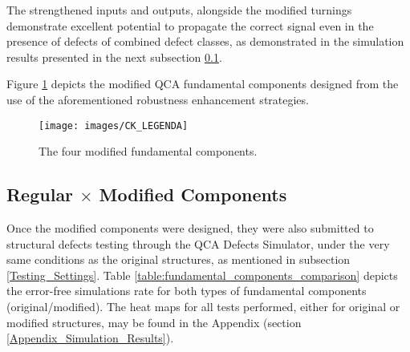 The strengthened inputs and outputs, alongside the modified turnings demonstrate excellent potential to propagate the correct signal even in the presence of defects of combined defect classes, as demonstrated in the simulation results presented in the next subsection \ref{subsection:Comparison_Between_Robustness_Levels}.

Figure \ref{figure:modified_fundamental_components} depicts the modified QCA fundamental components designed from the use of the aforementioned robustness enhancement strategies.

\begin{figure}[!ht]
\center
{}
\hfill
{}
\linebreak
{}
\hfill
{}
\linebreak
{\texttt{[image: images/CK\_LEGENDA]}
}
\caption{The four modified fundamental components.}
\label{figure:modified_fundamental_components}
\end{figure}

\subsection{Regular $\times$ Modified Components}
\label{subsection:Comparison_Between_Robustness_Levels}

Once the modified components were designed, they were also submitted to structural defects testing through the QCA Defects Simulator, under the very same conditions as the original structures, as mentioned in subsection \ref{Testing_Settings}. Table \ref{table:fundamental_components_comparison} depicts the error-free simulations rate for both types of fundamental components (original/modified). The heat maps for all tests performed, either for original or modified structures, may be found in the Appendix (section \ref{Appendix_Simulation_Results}).

